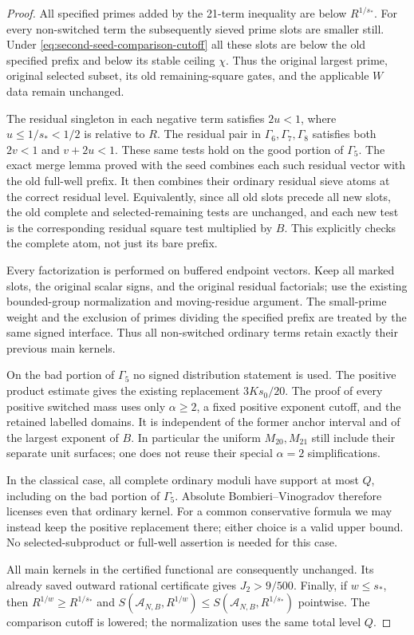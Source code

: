 \documentclass[11pt]{article}
\begin{document}
\begin{proof}
All specified primes added by the 21-term inequality are below
$R^{1/s_*}$.  For every non-switched term the subsequently sieved
prime slots are smaller still.  Under
\eqref{eq:second-seed-comparison-cutoff} all these slots are below
the old specified prefix and below its stable ceiling $\chi$.
Thus the original largest prime, original selected subset, its old
remaining-square gates, and the applicable $W$ data remain unchanged.

The residual singleton in each negative term satisfies $2u<1$,
where $u\le1/s_*<1/2$ is relative to $R$.  The residual pair in
$\Gamma_6,\Gamma_7,\Gamma_8$ satisfies both $2v<1$ and $v+2u<1$.
These same tests hold on the good portion of $\Gamma_5$.
The exact merge lemma proved with the seed combines each such
residual vector with the old full-well prefix.  It then combines
their ordinary residual sieve atoms at the correct residual level.
Equivalently, since all old slots precede all new slots, the old
complete and selected-remaining tests are unchanged, and each new
test is the corresponding residual square test multiplied by $B$.
This explicitly checks the complete atom, not just its bare prefix.

Every factorization is performed on buffered endpoint vectors.
Keep all marked slots, the original scalar signs, and the original
residual factorials; use the existing bounded-group normalization
and moving-residue argument.  The small-prime weight and the
exclusion of primes dividing the specified prefix are treated by
the same signed interface.  Thus all non-switched ordinary terms
retain exactly their previous main kernels.

On the bad portion of $\Gamma_5$ no signed distribution statement
is used.  The positive product estimate gives the existing
replacement $3Ks_0/20$.  The proof of every positive switched mass
uses only $\alpha\ge2$, a fixed positive exponent cutoff, and the
retained labelled domains.  It is independent of the former anchor
interval and of the largest exponent of $B$.  In particular the
uniform $M_{20},M_{21}$ still include their separate unit surfaces;
one does not reuse their special $\alpha=2$ simplifications.

In the classical case, all complete ordinary moduli have support
at most $Q$, including on the bad portion of $\Gamma_5$.  Absolute
Bombieri--Vinogradov therefore licenses even that ordinary kernel.
For a common conservative formula we may instead keep the positive
replacement there; either choice is a valid upper bound.  No
selected-subproduct or full-well assertion is needed for this case.

All main kernels in the certified functional are consequently
unchanged.  Its already saved outward rational certificate gives
$J_2>9/500$.  Finally, if $w\le s_*$, then
$R^{1/w}\ge R^{1/s_*}$ and
$S(\mathcal A_{N,B},R^{1/w})\le
S(\mathcal A_{N,B},R^{1/s_*})$ pointwise.  The comparison cutoff
is lowered; the normalization uses the same total level $Q$.
\end{proof}
\end{document}

